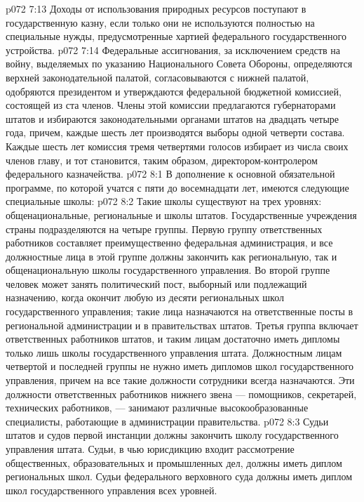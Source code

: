 \vs p072 7:13 \bibnobreakspace {} Доходы от использования природных ресурсов поступают в государственную казну, если только они не используются полностью на специальные нужды, предусмотренные хартией федерального государственного устройства.
\vs p072 7:14 \pc Федеральные ассигнования, за исключением средств на войну, выделяемых по указанию Национального Совета Обороны, определяются верхней законодательной палатой, согласовываются с нижней палатой, одобряются президентом и утверждаются федеральной бюджетной комиссией, состоящей из ста членов. Члены этой комиссии предлагаются губернаторами штатов и избираются законодательными органами штатов на двадцать четыре года, причем, каждые шесть лет производятся выборы одной четверти состава. Каждые шесть лет комиссия тремя четвертями голосов избирает из числа своих членов главу, и тот становится, таким образом, директором\hyp{}контролером федерального казначейства.
\vs p072 8:1 В дополнение к основной обязательной программе, по которой учатся с пяти до восемнадцати лет, имеются следующие специальные школы:
\vs p072 8:2 \bibnobreakspace {} Такие школы существуют на трех уровнях: общенациональные, региональные и школы штатов. Государственные учреждения страны подразделяются на четыре группы. Первую группу ответственных работников составляет преимущественно федеральная администрация, и все должностные лица в этой группе должны закончить как региональную, так и общенациональную школы государственного управления. Во второй группе человек может занять политический пост, выборный или подлежащий назначению, когда окончит любую из десяти региональных школ государственного управления; такие лица назначаются на ответственные посты в региональной администрации и в правительствах штатов. Третья группа включает ответственных работников штатов, и таким лицам достаточно иметь дипломы только лишь школы государственного управления штата. Должностным лицам четвертой и последней группы не нужно иметь дипломов школ государственного управления, причем на все такие должности сотрудники всегда назначаются. Эти должности ответственных работников нижнего звена --- помощников, секретарей, технических работников, --- занимают различные высокообразованные специалисты, работающие в администрации правительства.
\vs p072 8:3 Судьи штатов и судов первой инстанции должны закончить школу государственного управления штата. Судьи, в чью юрисдикцию входит рассмотрение общественных, образовательных и промышленных дел, должны иметь диплом региональных школ. Судьи федерального верховного суда должны иметь диплом школ государственного управления всех уровней.
